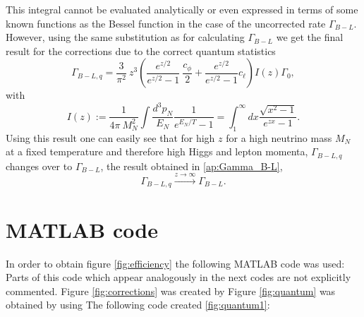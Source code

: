 This integral cannot be evaluated analytically or even expressed in terms of some known functions as the Bessel function in the case of the uncorrected rate $\Gamma_{B-L}$. However, using the same substitution as for calculating $\Gamma_{B-L}$ we get the final result for the corrections due to the correct quantum statistics
\begin{equation*}
	\Gamma_{B-L,q}=\frac{3}{\pi^2}\:z^3\left(\frac{e^{z/2}}{e^{z/2}-1}\:\frac{c_\phi}{2}+\frac{e^{z/2}}{e^{z/2}-1}c_\ell\right)I(z)\Gamma_0,
\end{equation*}
with 
\begin{equation*}
	I(z):=\frac{1}{4\pi\: M_N^2}\int \frac{d^3p_N}{E_N}\frac{1}{e^{E_N/T}-1}=\int_{1}^{\infty}dx\frac{\sqrt{x^2-1}}{e^{zx}-1}.
\end{equation*}
Using this result one can easily see that for high $z$ for a high neutrino mass $M_N$ at a fixed temperature and therefore high Higgs and lepton momenta, $\Gamma_{B-L,q}$ changes over to $\Gamma_{B-L}$, the result obtained in \ref{ap:Gamma_B-L},
\begin{equation*}
	\Gamma_{B-L,q}\overset{z\rightarrow\infty}{\longrightarrow}\Gamma_{B-L}.
\end{equation*}
\newpage
\section{MATLAB code}
\label{ap:matlab}
In order to obtain figure \ref{fig:efficiency} the following MATLAB code was used:
 Parts of this code which appear analogously in the next codes are not explicitly commented.
\newpage\noindent
Figure \ref{fig:corrections} was created by
\newpage\noindent
Figure \ref{fig:quantum} was obtained by using
\newpage\noindent
The following code created \ref{fig:quantum1}:


